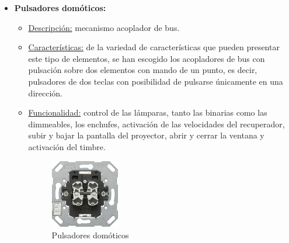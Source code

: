 \begin{itemize}
\item \textbf{Pulsadores domóticos:} 
	\begin{itemize}
	\item\underline{Descripción:} mecanismo acoplador de bus.
	\item \underline{Características:} de la variedad de características que pueden presentar este tipo de elementos, se han escogido los acopladores de bus con pulsación sobre dos elementos con mando de un punto, es decir, pulsadores de dos teclas con posibilidad de pulsarse únicamente en una dirección. 
	\item \underline{Funcionalidad:} control de las lámparas, tanto las binarias como las dimmeables, los enchufes, activación de las velocidades del recuperador, subir y bajar la pantalla del proyector, abrir y cerrar la ventana y activación del timbre.
	\begin{figure}[H]
	\centering
	\includegraphics[width=0.30\textwidth]{figures/pulsador.jpg}   
	\caption{Pulsadores domóticos}
	\label{fig:pulsador}
	\end{figure}
	\end{itemize} 


\end{itemize}
